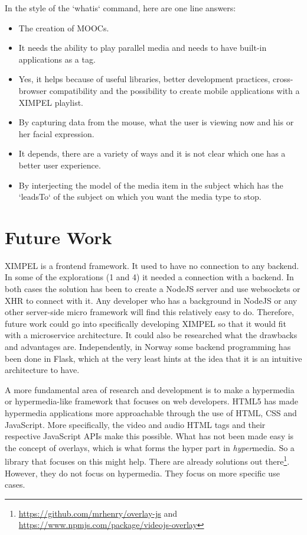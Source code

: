 In the style of the `whatis` command, here are one line answers:
\begin{itemize}
    \item The creation of MOOCs.
    \item It needs the ability to play parallel media and needs to have built-in applications as a tag.
    \item Yes, it helps because of useful libraries, better development practices, cross-browser compatibility and the possibility to create mobile applications with a XIMPEL playlist.
    \item By capturing data from the mouse, what the user is viewing now and his or her facial expression.
    \item It depends, there are a variety of ways and it is not clear which one has a better user experience.
    \item By interjecting the model of the media item in the subject which has the `leadsTo` of the subject on which you want the media type to stop.
\end{itemize}

\section{Future Work}

XIMPEL is a frontend framework. It used to have no connection to any backend. In some of the explorations (1 and 4) it needed a connection with a backend. In both cases the solution has been to create a NodeJS server and use websockets or XHR to connect with it. Any developer who has a background in NodeJS or any other server-side micro framework will find this relatively easy to do. Therefore, future work could go into specifically developing XIMPEL so that it would fit with a microservice architecture. It could also be researched what the drawbacks and advantages are. Independently, in Norway some backend programming has been done in Flask, which at the very least hints at the idea that it is an intuitive architecture to have.

A more fundamental area of research and development is to make a hypermedia or hypermedia-like framework that focuses on web developers. HTML5 has made hypermedia applications more approachable through the use of HTML, CSS and JavaScript. More specifically, the video and audio HTML tags and their respective JavaScript APIs make this possible. What has not been made easy is the concept of overlays, which is what forms the hyper part in \textit{hyper}media. So a library that focuses on this might help. There are already solutions out there\footnote{\url{https://github.com/mrhenry/overlay-js} and \url{https://www.npmjs.com/package/videojs-overlay}}. However, they do not focus on hypermedia. They focus on more specific use cases.

